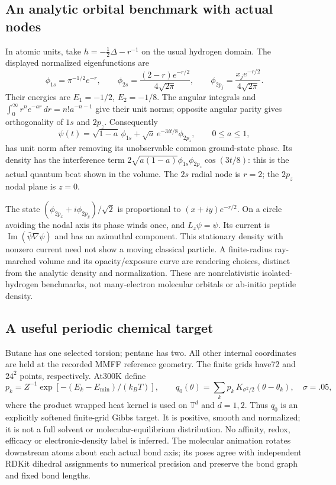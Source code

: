 \documentclass[11pt]{article}
\theoremstyle{definition}\newtheorem{definition}[theorem]{Definition}
\theoremstyle{remark}\newtheorem{remark}[theorem]{Remark}
\begin{document}
\subsection{An analytic orbital benchmark with actual nodes}
In atomic units, take $h=-\frac12\Delta-r^{-1}$ on the usual hydrogen domain.
The displayed normalized eigenfunctions are
\[
 \phi_{1s}=\pi^{-1/2}e^{-r},\qquad
 \phi_{2s}=\frac{(2-r)e^{-r/2}}{4\sqrt{2\pi}},\qquad
 \phi_{2p_j}=\frac{x_j e^{-r/2}}{4\sqrt{2\pi}}.
\]
Their energies are $E_1=-1/2$, $E_2=-1/8$. The angular integrals and
$\int_0^\infty r^n e^{-ar}\,dr=n!a^{-n-1}$ give their unit norms;
opposite angular parity gives orthogonality of $1s$ and $2p_z$.
Consequently
\[
 \psi(t)=\sqrt{1-a}\,\phi_{1s}
       +\sqrt a\,e^{-3it/8}\phi_{2p_z},\qquad 0\le a\le1,
\]
has unit norm after removing its unobservable common ground-state phase.
Its density has the interference term
$2\sqrt{a(1-a)}\phi_{1s}\phi_{2p_z}\cos(3t/8)$: this is the actual quantum
beat shown in the volume. The $2s$ radial node is $r=2$; the $2p_z$ nodal
plane is $z=0$.

The state $(\phi_{2p_x}+i\phi_{2p_y})/\sqrt2$ is proportional to
$(x+iy)e^{-r/2}$. On a circle avoiding the nodal axis its phase winds once,
and $L_z\psi=\psi$. Its current is
$\operatorname{Im}(\bar\psi\nabla\psi)$ and has an azimuthal component.
This stationary density with nonzero current need not show a moving classical
particle. A finite-radius ray-marched volume and its opacity/exposure curve
are rendering choices, distinct from the analytic density and normalization.
These are nonrelativistic isolated-hydrogen benchmarks, not many-electron
molecular orbitals or ab-initio peptide density.

\subsection{A useful periodic chemical target}
Butane has one selected torsion; pentane has two. All other internal coordinates
are held at the recorded MMFF reference geometry. The finite grids have72 and
$24^2$ points, respectively. At300K define
\[
 p_k=Z^{-1}\exp[-(E_k-E_{\min})/(k_BT)],\qquad
 q_0(\theta)=\sum_k p_k\,K_{\sigma^2/2}(\theta-\theta_k),\quad \sigma=.05,
\]
where the product wrapped heat kernel is used on $\mathbb T^d$ and $d=1,2$.
Thus $q_0$ is an explicitly softened finite-grid Gibbs target. It is positive,
smooth and normalized; it is not a full solvent or molecular-equilibrium
distribution. No affinity, redox, efficacy or electronic-density label is inferred.
The molecular animation rotates downstream atoms about each actual bond axis;
its poses agree with independent RDKit dihedral assignments to numerical
precision and preserve the bond graph and fixed bond lengths.
\end{document}
